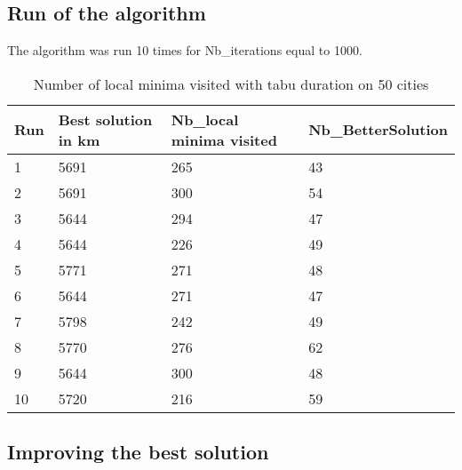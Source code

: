 \documentclass[12pt,oneside,a4paper]{article}
\begin{document}
\subsection{Run of the algorithm}
The algorithm was run 10 times for Nb\_iterations equal to 1000.
\begin{table}[h]
    \centering
    \small
    \begin{tabular}{llll}
      \hline
      \multicolumn{1}{|l|}{\textbf{Run}}& \multicolumn{1}{l|}{\textbf{Best solution in km}}& \multicolumn{1}{l|}{\textbf{Nb\_local minima visited}}& \multicolumn{1}{l|}{\textbf{Nb\_BetterSolution}}\\ \hline
      \multicolumn{1}{|l|}{1} & \multicolumn{1}{l|}{5691}  & \multicolumn{1}{l|}{265} & \multicolumn{1}{l|}{43}  \\ \hline
      \multicolumn{1}{|l|}{2} & \multicolumn{1}{l|}{5691}  & \multicolumn{1}{l|}{300} & \multicolumn{1}{l|}{54}  \\ \hline         
      \multicolumn{1}{|l|}{3} & \multicolumn{1}{l|}{5644}  & \multicolumn{1}{l|}{294}  & \multicolumn{1}{l|}{47}  \\ \hline
      \multicolumn{1}{|l|}{4} & \multicolumn{1}{l|}{5644}  & \multicolumn{1}{l|}{226}  & \multicolumn{1}{l|}{49}  \\ \hline
      \multicolumn{1}{|l|}{5} & \multicolumn{1}{l|}{5771}  & \multicolumn{1}{l|}{271}  & \multicolumn{1}{l|}{48}  \\ \hline
      \multicolumn{1}{|l|}{6} & \multicolumn{1}{l|}{5644}  & \multicolumn{1}{l|}{271}  & \multicolumn{1}{l|}{47}  \\ \hline
      \multicolumn{1}{|l|}{7} & \multicolumn{1}{l|}{5798}  & \multicolumn{1}{l|}{242}  & \multicolumn{1}{l|}{49}  \\ \hline
      \multicolumn{1}{|l|}{8} & \multicolumn{1}{l|}{5770}  & \multicolumn{1}{l|}{276} & \multicolumn{1}{l|}{62}  \\ \hline
      \multicolumn{1}{|l|}{9} & \multicolumn{1}{l|}{5644}  & \multicolumn{1}{l|}{300} & \multicolumn{1}{l|}{48}  \\ \hline
      \multicolumn{1}{|l|}{10} & \multicolumn{1}{l|}{5720}  & \multicolumn{1}{l|}{216} & \multicolumn{1}{l|}{59}  \\ \hline
    \end{tabular}
    \caption{Number of local minima visited with tabu duration on 50 cities}
    \label{Performances scénario 0}
  \end{table}

\subsection{Improving the best solution}
\end{document}
